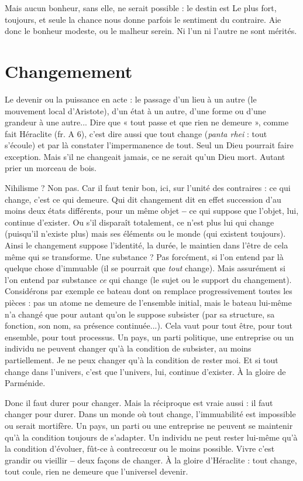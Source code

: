Mais aucun bonheur, sans elle, ne serait possible : le destin est Le plus fort,
toujours, et seule la chance nous donne parfois le sentiment du contraire. Aie
donc le bonheur modeste, ou le malheur serein. Ni l’un ni l’autre ne sont
mérités.

\section{Changemement}
Le devenir ou la puissance en acte : le passage d’un lieu à
un autre (le mouvement local d’Aristote), d’un état à un
autre, d’une forme ou d’une grandeur à une autre... Dire que « tout passe et
que rien ne demeure », comme fait Héraclite (fr. A 6), c’est dire aussi que tout
change ({\it panta rhei} : tout s’écoule) et par là constater l’impermanence de tout.
Seul un Dieu pourrait faire exception. Mais s’il ne changeait jamais, ce ne serait
qu’un Dieu mort. Autant prier un morceau de bois.

Nihilisme ? Non pas. Car il faut tenir bon, ici, sur l’unité des contraires : ce
qui change, c’est ce qui demeure. Qui dit changement dit en effet succession
d’au moins deux états différents, pour un même objet {\bf --} ce qui suppose que
l’objet, lui, continue d’exister. Ou s’il disparaît totalement, ce n’est plus lui qui
change (puisqu'il n’existe plus) mais ses éléments ou le monde (qui existent
toujours). Ainsi le changement suppose l'identité, la durée, le maintien dans
l’être de cela même qui se transforme. Une substance ? Pas forcément, si l’on
entend par là quelque chose d’immuable (il se pourrait que {\it tout} change). Mais
assurément si l’on entend par substance {\it ce} qui change (le sujet ou le support du
changement). Considérons par exemple ce bateau dont on remplace progressivement
toutes les pièces : pas un atome ne demeure de l’ensemble initial, mais
le bateau lui-même n’a changé que pour autant qu’on le suppose subsister (par
sa structure, sa fonction, son nom, sa présence continuée...). Cela vaut pour
tout être, pour tout ensemble, pour tout processus. Un pays, un parti politique,
une entreprise ou un individu ne peuvent changer qu’à la condition de subsister,
au moins partiellement. Je ne peux changer qu’à la condition de rester
moi. Et si tout change dans l’univers, c’est que l’univers, lui, continue d’exister.
À la gloire de Parménide.

Donc il faut durer pour changer. Mais la réciproque est vraie aussi : il faut
changer pour durer. Dans un monde où tout change, l’immuabilité est impossible
ou serait mortifère. Un pays, un parti ou une entreprise ne peuvent se
maintenir qu’à la condition toujours de s’adapter. Un individu ne peut rester
lui-même qu’à la condition d’évoluer, fût-ce à contrecœur ou le moins possible.
Vivre c’est grandir ou vieillir {\bf --} deux façons de changer. À la gloire
d’Héraclite : tout change, tout coule, rien ne demeure que l’universel devenir.

